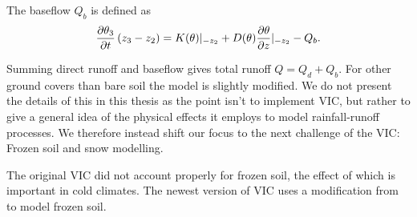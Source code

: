 The baseflow $Q_b$ is defined as \citep{VIC2L}
\begin{equation}
    \pdv{\theta_3}{t} \left(z_3 - z_2\right) = K(\theta)|_{-z_2} + D(\theta)
    \pdv{\theta}{z}|_{-z_2} - Q_b. \label{Qb}
\end{equation}

Summing direct runoff and baseflow gives total runoff $Q=Q_d + Q_b$. For other ground covers 
than bare soil the model is slightly modified. We do not present the details of 
this in this thesis as the point isn't to implement VIC, but rather to give a general 
idea of the physical effects it employs to model rainfall-runoff processes. We therefore 
instead shift our focus to the next challenge of the VIC: Frozen soil and snow modelling.

The original VIC did not account 
properly for frozen soil, the effect of which is important in cold climates.
The newest version of VIC \citep{VIC5} uses a modification from \citet{VICFrozenSoil}
to model frozen soil. 

